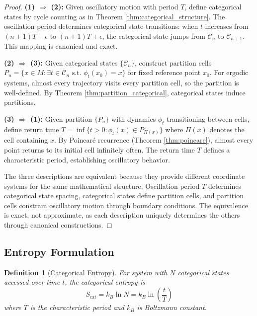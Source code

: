\documentclass[twocolumn,10pt]{article}
\newtheorem{definition}{Definition}[section]
\begin{document}
\begin{proof}
\textbf{(1) $\Rightarrow$ (2):} Given oscillatory motion with period $T$, define categorical states by cycle counting as in Theorem \ref{thm:categorical_structure}. The oscillation period determines categorical state transitions: when $t$ increases from $(n+1)T - \epsilon$ to $(n+1)T + \epsilon$, the categorical state jumps from $\mathcal{C}_n$ to $\mathcal{C}_{n+1}$. This mapping is canonical and exact.

\textbf{(2) $\Rightarrow$ (3):} Given categorical states $\{\mathcal{C}_n\}$, construct partition cells $P_n = \{x \in M : \exists t \in \mathcal{C}_n \text{ s.t. } \phi_t(x_0) = x\}$ for fixed reference point $x_0$. For ergodic systems, almost every trajectory visits every partition cell, so the partition is well-defined. By Theorem \ref{thm:partition_categorical}, categorical states induce partitions.

\textbf{(3) $\Rightarrow$ (1):} Given partition $\{P_n\}$ with dynamics $\phi_t$ transitioning between cells, define return time $T = \inf\{t > 0 : \phi_t(x) \in P_{\Pi(x)}\}$ where $\Pi(x)$ denotes the cell containing $x$. By Poincar\'e recurrence (Theorem \ref{thm:poincare}), almost every point returns to its initial cell infinitely often. The return time $T$ defines a characteristic period, establishing oscillatory behavior.

The three descriptions are equivalent because they provide different coordinate systems for the same mathematical structure. Oscillation period $T$ determines categorical state spacing, categorical states define partition cells, and partition cells constrain oscillatory motion through boundary conditions. The equivalence is exact, not approximate, as each description uniquely determines the others through canonical constructions.
\end{proof}

\subsection{Entropy Formulation}

\begin{definition}[Categorical Entropy]
For system with $N$ categorical states accessed over time $t$, the categorical entropy is
\begin{equation}
S_{\text{cat}} = k_B \ln N = k_B \ln\left(\frac{t}{T}\right)
\end{equation}
where $T$ is the characteristic period and $k_B$ is Boltzmann constant.
\end{definition}
\end{document}
